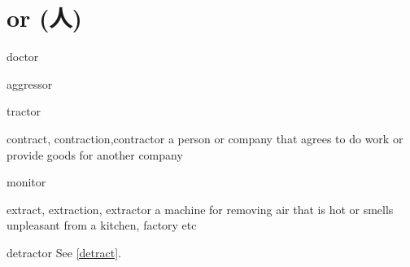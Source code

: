 \chapter{or (人)}

\begin{word}{doctor}
\end{word}

\begin{word}{aggressor}
\end{word}

\begin{word}{tractor}
\end{word}

\begin{word}{contract, contraction,contractor}
    a person or company that agrees to do work or provide goods for another company
\end{word}

\begin{word}{monitor}
\end{word}

\begin{word}{extract, extraction, extractor}
    a machine for removing air that is hot or smells unpleasant from a kitchen, factory etc
\end{word}

\begin{word}{detractor}
    See \ref{detract}.
\end{word}
